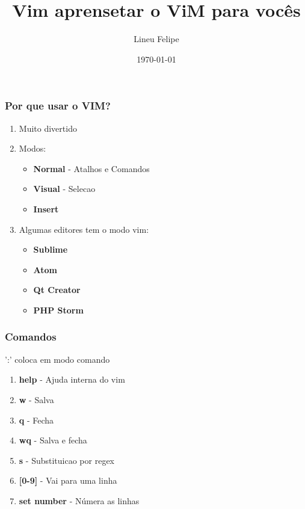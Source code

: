 \documentclass[aspectratio=169]{beamer}
\title[\sc{Vim aprensetar o ViM para vocês}]{Vim aprensetar o ViM para vocês}
\author[Lineu Felipe]{Lineu Felipe}
\institute{Socialbase} %
\date{\today}
\begin{document}
\begin{frame}
    \titlepage
\end{frame}

\begin{frame}\frametitle{Por que usar o VIM?}
    \pause
    \begin{enumerate}
        \item <1-> Muito divertido \pause
        \item <2-> Modos:
            \begin{itemize}
                \item \textbf{Normal} - Atalhos e Comandos
                \item \textbf{Visual} - Selecao
                \item \textbf{Insert}
            \end{itemize}
            \pause
        \item <3-> Algumas editores tem o modo vim:
            \begin{itemize}
                \item \textbf{Sublime}
                \item \textbf{Atom}
                \item \textbf{Qt Creator}
                \item \textbf{PHP Storm}
            \end{itemize}
    \end{enumerate}
\end{frame}

\begin{frame}\frametitle{Comandos}
    ':' coloca em modo comando
    \begin{enumerate}
        \item \textbf{help} - Ajuda interna do vim
        \item \textbf{w} - Salva
        \item \textbf{q} - Fecha
        \item \textbf{wq} - Salva e fecha
        \item \textbf{s} - Substituicao por regex
        \item \textbf{[0-9]} - Vai para uma linha
        \item \textbf{set number} - Númera as linhas
    \end{enumerate}
\end{frame}
\end{document}
